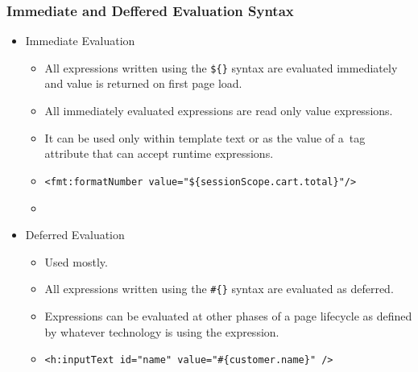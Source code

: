 \documentclass[10pt,xcolor=pdflatex]{beamer}
\begin{document}
\begin{frame}[containsverbatim]\frametitle{Immediate and Deffered Evaluation Syntax}
	\begin{itemize}
    	\item Immediate Evaluation
		  \begin{itemize}
			\item All expressions written using the \verb;${}; syntax are evaluated immediately and value is returned on first page load.
            \item All immediately evaluated expressions are read only value expressions.
			\item It can be used only within template text or as the value of a~tag attribute that can accept runtime expressions.
			\item[] \verb;<fmt:formatNumber value="${sessionScope.cart.total}"/>;
            \item[] 
          \end{itemize}
    \item Deferred Evaluation
      \begin{itemize}
        \item Used mostly.
    	\item All expressions written using the \verb;#{}; syntax are evaluated as deferred.
		\item Expressions can be evaluated at other phases of a page lifecycle as defined by whatever technology is using the expression.
		\item[] \verb;<h:inputText id="name" value="#{customer.name}" />;
      \end{itemize}
    \end{itemize}
\end{frame}
\end{document}
